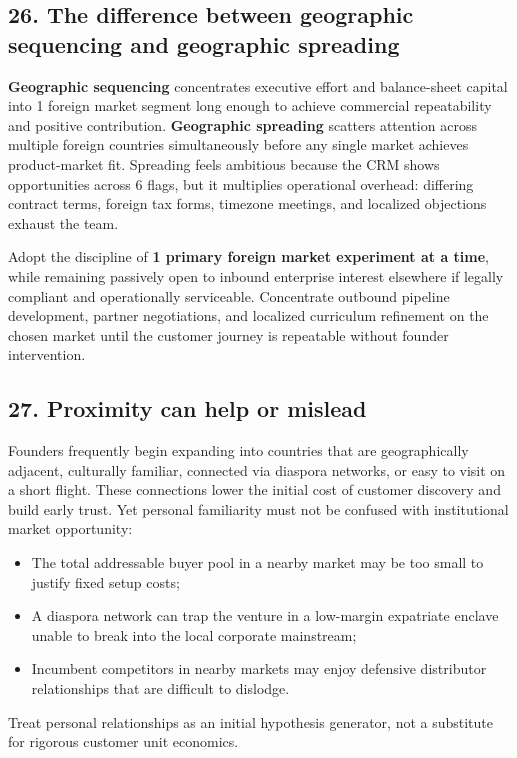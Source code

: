 \subsection{26. The difference between geographic sequencing and geographic spreading}

\textbf{Geographic sequencing} concentrates executive effort and balance-sheet capital into 1 foreign market segment long enough to achieve commercial repeatability and positive contribution. \textbf{Geographic spreading} scatters attention across multiple foreign countries simultaneously before any single market achieves product-market fit. Spreading feels ambitious because the CRM shows opportunities across 6 flags, but it multiplies operational overhead: differing contract terms, foreign tax forms, timezone meetings, and localized objections exhaust the team.

Adopt the discipline of \textbf{1 primary foreign market experiment at a time}, while remaining passively open to inbound enterprise interest elsewhere if legally compliant and operationally serviceable. Concentrate outbound pipeline development, partner negotiations, and localized curriculum refinement on the chosen market until the customer journey is repeatable without founder intervention.

\subsection{27. Proximity can help or mislead}

Founders frequently begin expanding into countries that are geographically adjacent, culturally familiar, connected via diaspora networks, or easy to visit on a short flight. These connections lower the initial cost of customer discovery and build early trust. Yet personal familiarity must not be confused with institutional market opportunity:
\begin{itemize}
    \item The total addressable buyer pool in a nearby market may be too small to justify fixed setup costs;
    \item A diaspora network can trap the venture in a low-margin expatriate enclave unable to break into the local corporate mainstream;
    \item Incumbent competitors in nearby markets may enjoy defensive distributor relationships that are difficult to dislodge.
\end{itemize}
Treat personal relationships as an initial hypothesis generator, not a substitute for rigorous customer unit economics.

